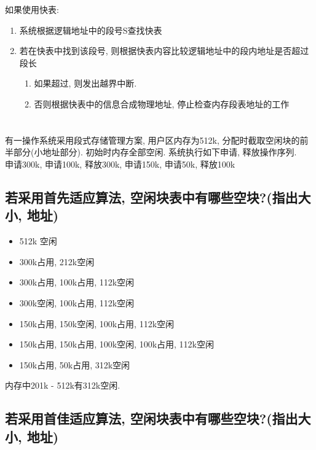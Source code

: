 \documentclass[a4paper, 12pt, notitlepage]{article}
\begin{document}
	如果使用快表: 
	
\begin{enumerate}
	\item 系统根据逻辑地址中的段号S查找快表
	\item 若在快表中找到该段号, 则根据快表内容比较逻辑地址中的段内地址是否超过段长
	\begin{enumerate}
		\item 如果超过, 则发出越界中断. 
		\item 否则根据快表中的信息合成物理地址, 停止检查内存段表地址的工作
	\end{enumerate}
\end{enumerate}
	
\section{ }

	有一操作系统采用段式存储管理方案, 用户区内存为512k, 分配时截取空闲块的前半部分(小地址部分). 初始时内存全部空闲. 系统执行如下申请, 释放操作序列. \\
	
	申请300k, 申请100k, 释放300k, 申请150k, 申请50k, 释放100k \\
	
\subsection{若采用首先适应算法, 空闲块表中有哪些空块?(指出大小, 地址)}

\begin{itemize}
	\item 512k 空闲
	\item 300k占用, 212k空闲
	\item 300k占用, 100k占用, 112k空闲
	\item 300k空闲, 100k占用, 112k空闲
	\item 150k占用, 150k空闲, 100k占用, 112k空闲
	\item 150k占用, 150k占用, 100k空闲, 100k占用, 112k空闲
	\item 150k占用, 50k占用, 312k空闲
\end{itemize}

	内存中201k - 512k有312k空闲. 

\subsection{若采用首佳适应算法, 空闲块表中有哪些空块?(指出大小, 地址)}
\end{document}
